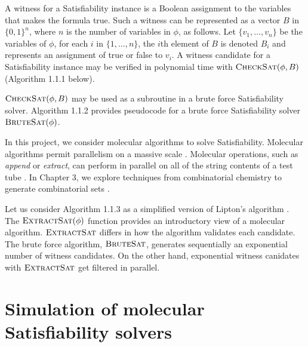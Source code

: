 A witness for a {\sc Satisfiability} instance is a Boolean assignment to the variables that makes the formula true.  Such a witness can be represented as a vector $B$ in $\{0,1\}^n$, where $n$ is the number of variables in $\phi$, as follows.  Let $\{v_1, \ldots , v_n\}$ be the variables of $\phi$, for each $i$ in $\{1, \ldots , n\}$, the $i$th element of $B$ is denoted $B_i$ and represents an assignment of true or false to $v_i$.   A witness candidate for a {\sc Satisfiability} instance may be verified in polynomial time with $\text{\sc CheckSat}(\phi, B)$ (Algorithm 1.1.1 below).

\FloatBarrier 



\FloatBarrier 

$\text{\sc CheckSat}(\phi, B)$ may be used as a subroutine in a brute force {\sc Satisfiability} solver.  Algorithm 1.1.2 provides pseudocode for a brute force {\sc Satisfiability} solver $\text{\sc BruteSat}(\phi)$.  

\FloatBarrier 



In this project, we consider molecular algorithms to solve {\sc Satisfiability}.  Molecular algorithms permit parallelism on a massive scale \cite{Adleman:1994:MCS:189441.189442, Lipton95usingdna}.  Molecular operations, such as \textit{append} or \textit{extract}, can perform in parallel on all of the string contents of a test tube \cite{Adleman:1994:MCS:189441.189442, Lipton95usingdna, dnaComputingModels2008}.  In Chapter 3, we explore techniques from combinatorial chemistry to generate combinatorial sets \cite{Lipton95usingdna, furkaBook, dnaComputingModels2008}.


\FloatBarrier 

Let us consider Algorithm 1.1.3 as a simplified version of Lipton's algorithm \cite{Lipton95usingdna, dnaComputingModels2008}.  The $\text{\sc ExtractSat}(\phi)$ function provides an introductory view of a molecular algorithm.  $\text{\sc ExtractSat}$ differs in how the algorithm validates each candidate.  The brute force algorithm, $\text{\sc BruteSat}$, generates sequentially an exponential number of witness candidates.  On the other hand, exponential witness canidates with $\text{\sc ExtractSat}$ get filtered in parallel.  
				
\section{Simulation of molecular {\sc Satisfiability} solvers}
	
